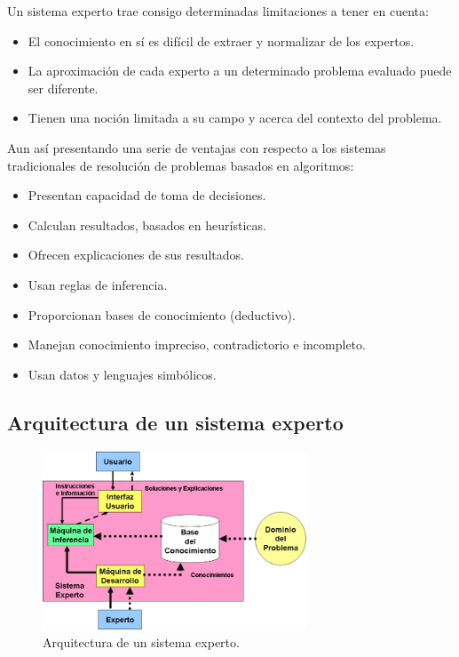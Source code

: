 \documentclass[a4paper, 11pt, titlepage]{article}
\begin{document}
    Un sistema experto trae consigo determinadas limitaciones a tener en cuenta:
    
    \begin{itemize}
        \item El conocimiento en sí es difícil de extraer y normalizar de los expertos.
        \item La aproximación de cada experto a un determinado problema evaluado puede ser diferente.
        \item Tienen una noción limitada a su campo y acerca del contexto del problema.
    \end{itemize}

    Aun así presentando una serie de ventajas con respecto a los sistemas tradicionales de 
    resolución de problemas basados en algoritmos:

    \begin{itemize}
        \item Presentan capacidad de toma de decisiones.
        \item Calculan resultados, basados en heurísticas.
        \item Ofrecen explicaciones de sus resultados.
        \item Usan reglas de inferencia.
        \item Proporcionan bases de conocimiento (deductivo).
        \item Manejan conocimiento impreciso, contradictorio e incompleto.
        \item Usan datos y lenguajes simbólicos.
    \end{itemize}

    \subsection{Arquitectura de un sistema experto}

        \begin{figure}[htp]
            \centering
            \includegraphics[width=0.7\textwidth]{resources/sistemaexperto.jpg}
            \caption{Arquitectura de un sistema experto.}
            \label{sistemaexperto}
        \end{figure}
\end{document}
